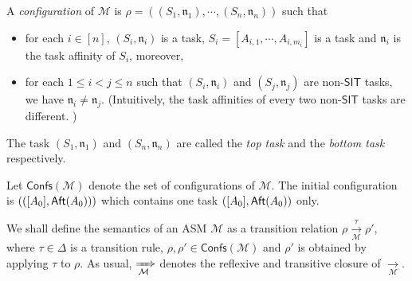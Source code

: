 \documentclass[preprint,12pt]{elsarticle}
\newcommand\Mm{{\mathcal{M} }}
\newcommand\aft{{\sf Aft}}
\newcommand\singleinstance{{\sf SIT}}
\newcommand{\AMASS}{\textsf{ASM}}
\newcommand\confs{{\mathsf{Confs} }}
\newcommand\conf{{\mathsf{Conf} }}
\newcommand\aname{\mathfrak{n}}
\newcommand{\SIT}{\mathsf{SIT}}
\newcommand{\tl}[1]{\color{magenta} {TL: #1 :LT} \color{black}}
\newcommand{\tl}[1]{}
\begin{document}
A \emph{configuration} of $\Mm$ is $\rho = ((S_1,\aname_1), \cdots, (S_n,\aname_n))$ such that
\begin{itemize}
\item for each $i \in [n]$, $(S_i,\aname_i)$ is a task, $S_i = [A_{i,1}, \cdots, A_{i, m_i}]$ is a task and $\aname_i$ is the task affinity of $S_i$, moreover, 
%
\item for each $1 \le i < j \le n$ such that $(S_i, \aname_i)$ and $(S_j, \aname_j)$ are non-$\SIT$ tasks,  we have $ \aname_i \neq \aname_j$.  (Intuitively, the task affinities of every two non-$\SIT$ tasks are different. )
\end{itemize}
The task $(S_1,\aname_1)$ and $(S_n,\aname_n)$ are called the \emph{top task} and the \emph{bottom task} respectively. 


Let $\confs(\Mm)$ denote the set of configurations of $\Mm$.
The initial configuration is $(([A_0],\aft(A_0)))$ which contains one task $([A_0], \aft(A_0))$ only. 


We shall define the semantics of an {\AMASS} $\Mm$ as a transition relation $\rho \xrightarrow[\Mm]{\tau} \rho'$, where $\tau \in \Delta$ is a transition rule, $\rho, \rho' \in \confs(\Mm)$ and $\rho'$ is obtained by applying $\tau$ to $\rho$. As usual, $\xRightarrow[\Mm]{}$ denotes the reflexive and transitive closure of $\xrightarrow[\Mm]{}$.




\end{document}

